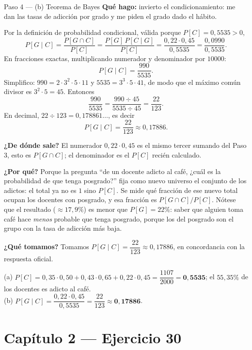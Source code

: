 \documentclass[11pt]{article}
\begin{document}
\begin{sol}
\begin{paso}{Paso 4 --- (b) Teorema de Bayes}
\textbf{Qu\'e hago:} invierto el condicionamiento: me dan las tasas de adicci\'on por grado y me piden el grado dado el h\'abito.

Por la definici\'on de probabilidad condicional, v\'alida porque $P[C]=0{,}5535>0$,
\[
P[G\mid C]=\frac{P[G\cap C]}{P[C]}=\frac{P[G]\,P[C\mid G]}{P[C]}
=\frac{0{,}22\cdot 0{,}45}{0{,}5535}
=\frac{0{,}0990}{0{,}5535}.
\]
En fracciones exactas, multiplicando numerador y denominador por $10000$:
\[
P[G\mid C]=\frac{990}{5535}.
\]
Simplifico: $990=2\cdot 3^{2}\cdot 5\cdot 11$ y $5535=3^{3}\cdot 5\cdot 41$, de modo que el m\'aximo com\'un divisor es $3^{2}\cdot 5=45$. Entonces
\[
\frac{990}{5535}=\frac{990\div 45}{5535\div 45}=\frac{22}{123}.
\]
En decimal, $22\div 123=0{,}178861\ldots$, es decir
\[
P[G\mid C]=\frac{22}{123}\approx 0{,}17886 .
\]

\textbf{¿De d\'onde sale?} El numerador $0{,}22\cdot 0{,}45$ es el mismo tercer sumando del Paso 3, esto es $P[G\cap C]$; el denominador es el $P[C]$ reci\'en calculado.

\textbf{¿Por qu\'e?} Porque la pregunta ``de un docente adicto al caf\'e, ¿cu\'al es la probabilidad de que tenga posgrado?'' fija como nuevo universo el conjunto de los adictos: el total ya no es $1$ sino $P[C]$. Se mide qu\'e fracci\'on de ese nuevo total ocupan los docentes con posgrado, y esa fracci\'on es $P[G\cap C]/P[C]$. N\'otese que el resultado ($\approx 17{,}9\%$) es menor que $P[G]=22\%$: saber que alguien toma caf\'e hace \emph{menos} probable que tenga posgrado, porque los del posgrado son el grupo con la tasa de adicci\'on m\'as baja.

\textbf{¿Qu\'e tomamos?} Tomamos $P[G\mid C]=\dfrac{22}{123}\approx 0{,}17886$, en concordancia con la respuesta oficial.
\end{paso}

\end{sol}

\begin{resp}
(a) $P[C]=0{,}35\cdot 0{,}50+0{,}43\cdot 0{,}65+0{,}22\cdot 0{,}45=\dfrac{1107}{2000}=\mathbf{0{,}5535}$; el $55{,}35\%$ de los docentes es adicto al caf\'e.\\[2pt]
(b) $P[G\mid C]=\dfrac{0{,}22\cdot 0{,}45}{0{,}5535}=\dfrac{22}{123}\approx\mathbf{0{,}17886}$.
\end{resp}

\section*{Cap\'itulo 2 --- Ejercicio 30}
\end{document}

